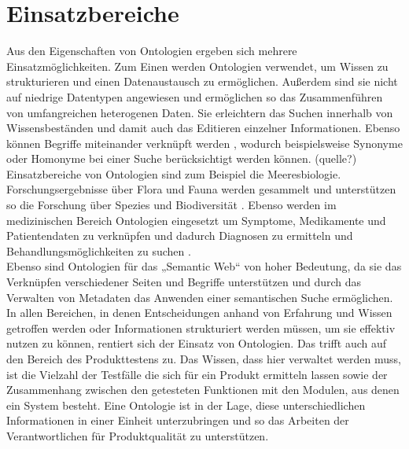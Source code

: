 \section{Einsatzbereiche}
Aus den Eigenschaften von Ontologien ergeben sich mehrere Einsatzmöglichkeiten. Zum Einen werden Ontologien verwendet, um Wissen zu strukturieren und einen Datenaustausch zu ermöglichen. Außerdem sind sie nicht auf niedrige Datentypen angewiesen und ermöglichen so das Zusammenführen von umfangreichen heterogenen Daten. Sie erleichtern das Suchen innerhalb von Wissensbeständen und damit auch das Editieren einzelner Informationen. Ebenso können Begriffe miteinander verknüpft werden \cite{BernersLee.2001}, wodurch beispielsweise Synonyme oder Homonyme bei einer Suche berücksichtigt werden können.
(quelle?)
Einsatzbereiche von Ontologien sind zum Beispiel die Meeresbiologie. Forschungsergebnisse über Flora und Fauna werden gesammelt und unterstützen so die Forschung über Spezies und Biodiversität \cite{Garoufallou.2013}.
Ebenso werden im medizinischen Bereich Ontologien eingesetzt um Symptome, Medikamente und Patientendaten zu verknüpfen und dadurch Diagnosen zu ermitteln und Behandlungsmöglichkeiten zu suchen \cite{WolfgangHesse.2005}.\\

Ebenso sind Ontologien für das „Semantic Web“ von hoher Bedeutung, da sie das Verknüpfen verschiedener Seiten und Begriffe unterstützen \cite{BernersLee.2001} und durch das Verwalten von Metadaten das Anwenden einer semantischen Suche ermöglichen. \newline
In allen Bereichen, in denen Entscheidungen anhand von Erfahrung und Wissen getroffen werden oder Informationen strukturiert werden müssen, um sie effektiv nutzen zu können, rentiert sich der Einsatz von Ontologien.\newline
Das trifft auch auf den Bereich des Produkttestens zu. Das Wissen, dass hier verwaltet werden muss, ist die Vielzahl der Testfälle die sich für ein Produkt ermitteln lassen sowie der Zusammenhang zwischen den getesteten Funktionen mit den Modulen, aus denen ein System besteht. Eine Ontologie ist in der Lage, diese unterschiedlichen Informationen in einer Einheit unterzubringen und so das Arbeiten der Verantwortlichen für Produktqualität zu unterstützen.